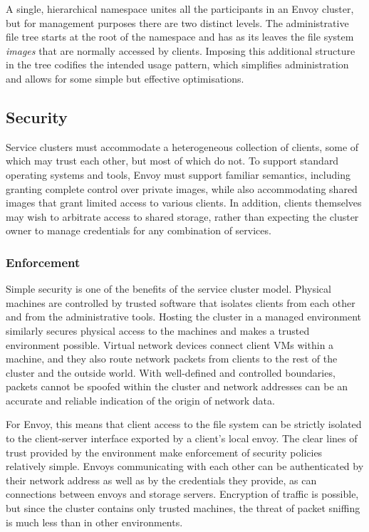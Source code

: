 A single, hierarchical namespace unites all the participants in an Envoy cluster, but for management purposes there are two distinct levels. The administrative file tree starts at the root of the namespace and has as its leaves the file system \emph{images} that are normally accessed by clients. Imposing this additional structure in the tree codifies the intended usage pattern, which simplifies administration and allows for some simple but effective optimisations.

\subsection{Security}

Service clusters must accommodate a heterogeneous collection of clients, some of which may trust each other, but most of which do not. To support standard operating systems and tools, Envoy must support familiar semantics, including granting complete control over private images, while also accommodating shared images that grant limited access to various clients. In addition, clients themselves may wish to arbitrate access to shared storage, rather than expecting the cluster owner to manage credentials for any combination of services.

\subsubsection{Enforcement}

Simple security is one of the benefits of the service cluster model. Physical machines are controlled by trusted software that isolates clients from each other and from the administrative tools. Hosting the cluster in a managed environment similarly secures physical access to the machines and makes a trusted environment possible. Virtual network devices connect client VMs within a machine, and they also route network packets from clients to the rest of the cluster and the outside world. With well-defined and controlled boundaries, packets cannot be spoofed within the cluster and network addresses can be an accurate and reliable indication of the origin of network data.

For Envoy, this means that client access to the file system can be strictly isolated to the client-server interface exported by a client's local envoy. The clear lines of trust provided by the environment make enforcement of security policies relatively simple. Envoys communicating with each other can be authenticated by their network address as well as by the credentials they provide, as can connections between envoys and storage servers. Encryption of traffic is possible, but since the cluster contains only trusted machines, the threat of packet sniffing is much less than in other environments.

